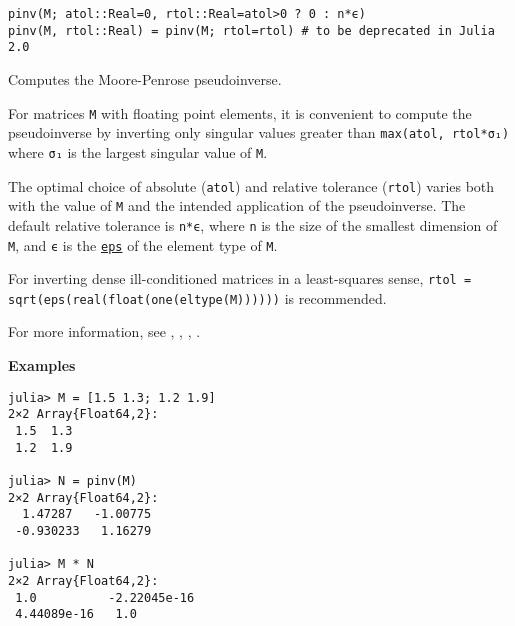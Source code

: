 \begin{adjustwidth}{2em}{0pt}


\begin{verbatim}
pinv(M; atol::Real=0, rtol::Real=atol>0 ? 0 : n*ϵ)
pinv(M, rtol::Real) = pinv(M; rtol=rtol) # to be deprecated in Julia 2.0
\end{verbatim}

Computes the Moore-Penrose pseudoinverse.

For matrices \texttt{M} with floating point elements, it is convenient to compute the pseudoinverse by inverting only singular values greater than \texttt{max(atol, rtol*σ₁)} where \texttt{σ₁} is the largest singular value of \texttt{M}.

The optimal choice of absolute (\texttt{atol}) and relative tolerance (\texttt{rtol}) varies both with the value of \texttt{M} and the intended application of the pseudoinverse. The default relative tolerance is \texttt{n*ϵ}, where \texttt{n} is the size of the smallest dimension of \texttt{M}, and \texttt{ϵ} is the \hyperlink{4594213520310841636}{\texttt{eps}} of the element type of \texttt{M}.

For inverting dense ill-conditioned matrices in a least-squares sense, \texttt{rtol = sqrt(eps(real(float(one(eltype(M))))))} is recommended.

For more information, see \footnotemark[4], \footnotemark[5], \footnotemark[6], \footnotemark[7].

\textbf{Examples}


\begin{verbatim}
julia> M = [1.5 1.3; 1.2 1.9]
2×2 Array{Float64,2}:
 1.5  1.3
 1.2  1.9

julia> N = pinv(M)
2×2 Array{Float64,2}:
  1.47287   -1.00775
 -0.930233   1.16279

julia> M * N
2×2 Array{Float64,2}:
 1.0          -2.22045e-16
 4.44089e-16   1.0
\end{verbatim}



\end{adjustwidth}

